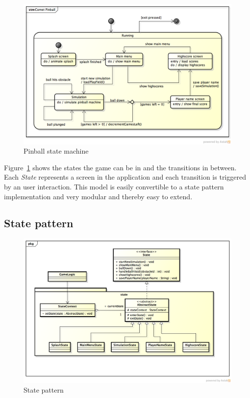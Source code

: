 \documentclass[fontsize=12pt,
               paper=a4,
               twoside=false,
               parskip=half,
               ]{scrartcl}
\begin{document}
\begin{figure}[h!]
	\centering
	\includegraphics[width=15.5cm]{./img/state-machine.png}
	\caption[Pinball state machine]{Pinball state machine}
	\label{fig:state_machine}
\end{figure}

Figure~\ref{fig:state_machine} shows the states the game can be in and the transitions in between. Each \emph{State} represents a screen in the application and each transition is triggered by an user interaction. This model is easily convertible to a state pattern implementation and very modular and thereby  easy to extend.

\subsection{State pattern}

\begin{figure}[h!]
	\centering
	\includegraphics[width=15.5cm]{./img/state-pattern.png}
	\caption[State pattern]{State pattern}
	\label{fig:state_pattern}
\end{figure}
\end{document}
